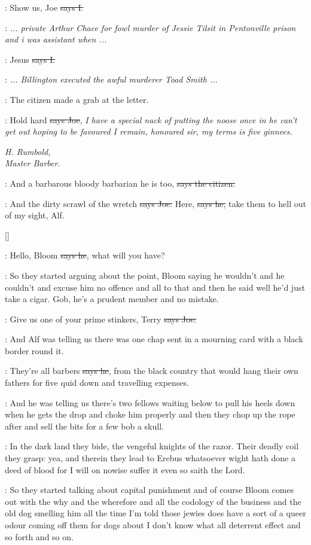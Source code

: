 :
Show us,
Joe
\sout{says I.}

\joe:
\emph{...
private Arthur Chace for fowl murder of Jessie Tilsit in
Pentonville prison and i was assistant when ...}

:
Jesus
\sout{says I.}

\joe:
\emph{...
Billington executed the awful murderer Toad Smith ...}

\Nq:
The citizen made a grab at the letter.

\joe:
Hold hard
\sout{says Joe},
\emph{I have a special nack of putting the noose once in
he can't get out hoping to be favoured I remain,
honoured sir,
my terms is
five ginnees.}

\emph{%
H.
Rumbold,
\\
Master Barber.}

\citizen:
And a barbarous bloody barbarian he is too,
\sout{says the citizen.}

\joe:
And the dirty scrawl of the wretch
\sout{says Joe.}
Here,
\sout{says he,} take them
to hell out of my sight,
Alf.

[]

\joe:
Hello,
Bloom
\sout{says he},
what will you have?

\Nq:
So they started arguing about the point,
Bloom saying he wouldn't
and he couldn't and excuse him no offence and all to that and then he said
well he'd just take a cigar.
Gob,
he's a prudent member and no mistake.

\joe:
Give us one of your prime stinkers,
Terry
\sout{says Joe.}

\Nq:
And Alf was telling us there was one chap sent in a mourning card
with a black border
round it.

\bergan:
They're all barbers
\sout{says he},
from the black country that would hang
their own fathers for five quid down and travelling expenses.

\Nq:
And he was telling us there's two fellows waiting below to pull his
heels down when he gets the drop and choke him properly and then they
chop up the rope after and sell the bits for a few bob a skull.

:
In the dark land they bide,
the vengeful knights of the razor.
Their
deadly coil they grasp:
yea,
and therein they lead to Erebus whatsoever
wight hath done a deed of blood for I will on nowise suffer it even so
saith the Lord.

\Nq:
So they started talking about capital punishment
and of course Bloom
comes out with the why and the wherefore and all the codology of the
business and the old dog smelling him all the time I'm told those jewies
does have a sort of a queer odour coming off them for dogs about I don't
know what all deterrent effect and so forth and so on.

